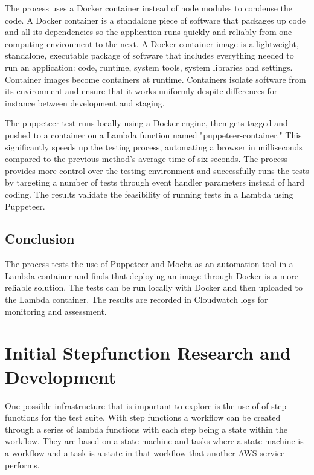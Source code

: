 \documentclass[12pt,a4paper,titlepage]{report}
\begin{document}
The process uses a Docker container instead of node modules to condense the code. A Docker
container is a standalone piece of software that packages up code and all its dependencies so the application runs quickly and reliably from one computing environment to the next.
A Docker container image is a lightweight, standalone, executable package of software that includes everything needed to run an application: code, runtime, system tools, system libraries and settings.
Container images become containers at runtime. Containers isolate software from its environment and ensure that it works uniformly despite differences for instance between development and staging.

The puppeteer test runs locally using a Docker engine, then gets tagged and pushed to a container on a Lambda function named "puppeteer-container."
This significantly speeds up the testing process, automating a browser in milliseconds compared to the previous method's average time of six seconds.
The process provides more control over the testing environment and successfully runs the tests by targeting a number of tests through event handler parameters instead of hard coding.
The results validate the feasibility of running tests in a Lambda using Puppeteer.

\subsection{Conclusion}

The process tests the use of Puppeteer and Mocha as an automation tool in a Lambda container and finds that deploying an image through Docker is a more reliable solution. The tests can be run locally with Docker and then uploaded to the Lambda container. The results are recorded in Cloudwatch logs for monitoring and assessment.

\section{Initial Stepfunction Research and Development}

One possible infrastructure that is important to explore is the use of of step functions for the test suite. With
step functions a workflow can be created through a series of lambda functions with each step being a state within
the workflow. They are based on a state machine and tasks where a state machine is a workflow and a task is a
state in that workflow that another AWS service performs.
\end{document}
